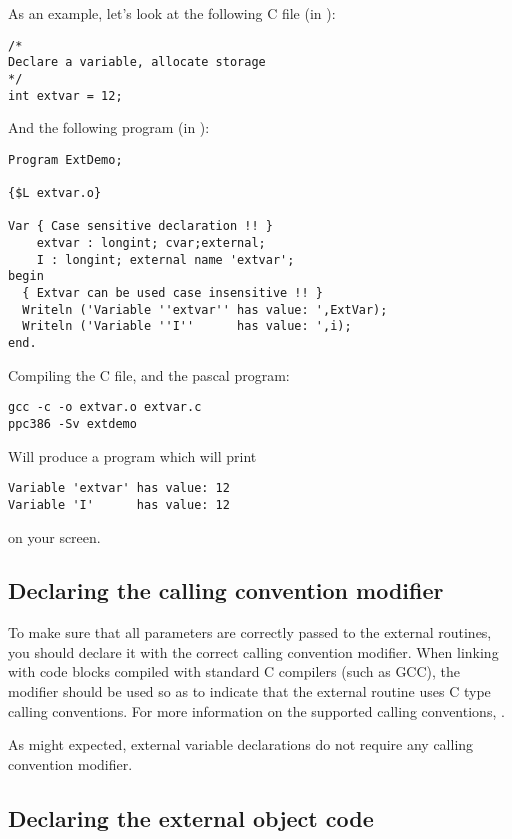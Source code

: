 As an example, let's look at the following C file (in ):
\begin{verbatim}
/*
Declare a variable, allocate storage
*/
int extvar = 12;
\end{verbatim}
And the following program (in ):
\begin{verbatim}
Program ExtDemo;

{$L extvar.o}

Var { Case sensitive declaration !! }
    extvar : longint; cvar;external;
    I : longint; external name 'extvar';
begin
  { Extvar can be used case insensitive !! }
  Writeln ('Variable ''extvar'' has value: ',ExtVar);
  Writeln ('Variable ''I''      has value: ',i);
end.
\end{verbatim}
Compiling the C file, and the pascal program:
\begin{verbatim}
gcc -c -o extvar.o extvar.c
ppc386 -Sv extdemo
\end{verbatim}
Will produce a program  which will print
\begin{verbatim}
Variable 'extvar' has value: 12
Variable 'I'      has value: 12
\end{verbatim}
on your screen.

\subsection{Declaring the calling convention modifier}

To make sure that all parameters are correctly passed to the
external routines, you should declare it with the correct
calling convention modifier. When linking with code blocks
compiled with standard C compilers (such as GCC), the 
modifier should be used so as to indicate that the external
routine uses C type calling conventions. For more information
on the supported calling conventions, .

As might expected, external variable declarations do not require
any calling convention modifier.

\subsection{Declaring the external object code}

